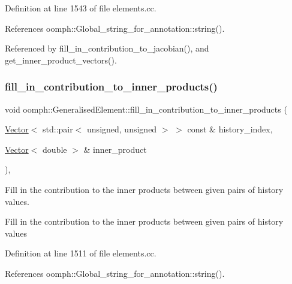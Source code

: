 Definition at line 1543 of file elements.\+cc.



References oomph\+::\+Global\+\_\+string\+\_\+for\+\_\+annotation\+::string().



Referenced by fill\+\_\+in\+\_\+contribution\+\_\+to\+\_\+jacobian(), and get\+\_\+inner\+\_\+product\+\_\+vectors().

\mbox{\label{classoomph_1_1GeneralisedElement_aa69127912ea0def7044311c86e5d6eac}} 
\subsubsection{\texorpdfstring{fill\+\_\+in\+\_\+contribution\+\_\+to\+\_\+inner\+\_\+products()}{fill\_in\_contribution\_to\_inner\_products()}}
{\footnotesize\ttfamily void oomph\+::\+Generalised\+Element\+::fill\+\_\+in\+\_\+contribution\+\_\+to\+\_\+inner\+\_\+products (\begin{DoxyParamCaption}\item[{\hyperlink{classoomph_1_1Vector}{Vector}$<$ std\+::pair$<$ unsigned, unsigned $>$ $>$ const \&}]{history\+\_\+index,  }\item[{\hyperlink{classoomph_1_1Vector}{Vector}$<$ double $>$ \&}]{inner\+\_\+product }\end{DoxyParamCaption})\hspace{0.3cm}{\ttfamily [protected]}, {\ttfamily [virtual]}}



Fill in the contribution to the inner products between given pairs of history values. 

Fill in the contribution to the inner products between given pairs of history values 

Definition at line 1511 of file elements.\+cc.



References oomph\+::\+Global\+\_\+string\+\_\+for\+\_\+annotation\+::string().




